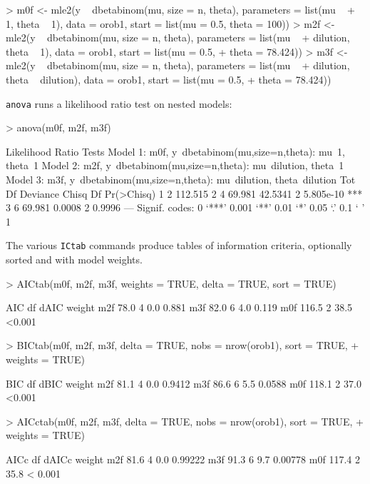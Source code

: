 \documentclass{article}
\newcommand{\code}[1]{{\tt #1}}
\begin{document}
\begin{Schunk}
\begin{Sinput}
> m0f <- mle2(y ~ dbetabinom(mu, size = n, theta), parameters = list(mu ~ 
+     1, theta ~ 1), data = orob1, start = list(mu = 0.5, theta = 100))
> m2f <- mle2(y ~ dbetabinom(mu, size = n, theta), parameters = list(mu ~ 
+     dilution, theta ~ 1), data = orob1, start = list(mu = 0.5, 
+     theta = 78.424))
> m3f <- mle2(y ~ dbetabinom(mu, size = n, theta), parameters = list(mu ~ 
+     dilution, theta ~ dilution), data = orob1, start = list(mu = 0.5, 
+     theta = 78.424))
\end{Sinput}
\end{Schunk}

\code{anova} runs a likelihood ratio test on nested
models:
\begin{Schunk}
\begin{Sinput}
> anova(m0f, m2f, m3f)
\end{Sinput}
\begin{Soutput}
Likelihood Ratio Tests
Model 1: m0f, y~dbetabinom(mu,size=n,theta): mu~1, theta~1
Model 2: m2f, y~dbetabinom(mu,size=n,theta): mu~dilution, theta~1
Model 3: m3f, y~dbetabinom(mu,size=n,theta): mu~dilution, theta~dilution
  Tot Df Deviance   Chisq Df Pr(>Chisq)    
1      2  112.515                          
2      4   69.981 42.5341  2  5.805e-10 ***
3      6   69.981  0.0008  2     0.9996    
---
Signif. codes:  0 ‘***’ 0.001 ‘**’ 0.01 ‘*’ 0.05 ‘.’ 0.1 ‘ ’ 1 
\end{Soutput}
\end{Schunk}

The various \code{ICtab} commands produce tables of
information criteria, optionally sorted and
with model weights.
\begin{Schunk}
\begin{Sinput}
> AICtab(m0f, m2f, m3f, weights = TRUE, delta = TRUE, sort = TRUE)
\end{Sinput}
\begin{Soutput}
    AIC   df dAIC  weight
m2f  78.0 4    0.0 0.881 
m3f  82.0 6    4.0 0.119 
m0f 116.5 2   38.5 <0.001
\end{Soutput}
\begin{Sinput}
> BICtab(m0f, m2f, m3f, delta = TRUE, nobs = nrow(orob1), sort = TRUE, 
+     weights = TRUE)
\end{Sinput}
\begin{Soutput}
    BIC   df dBIC  weight
m2f  81.1 4    0.0 0.9412
m3f  86.6 6    5.5 0.0588
m0f 118.1 2   37.0 <0.001
\end{Soutput}
\begin{Sinput}
> AICctab(m0f, m2f, m3f, delta = TRUE, nobs = nrow(orob1), sort = TRUE, 
+     weights = TRUE)
\end{Sinput}
\begin{Soutput}
    AICc  df dAICc weight 
m2f  81.6 4    0.0 0.99222
m3f  91.3 6    9.7 0.00778
m0f 117.4 2   35.8 < 0.001
\end{Soutput}
\end{Schunk}
\end{document}
